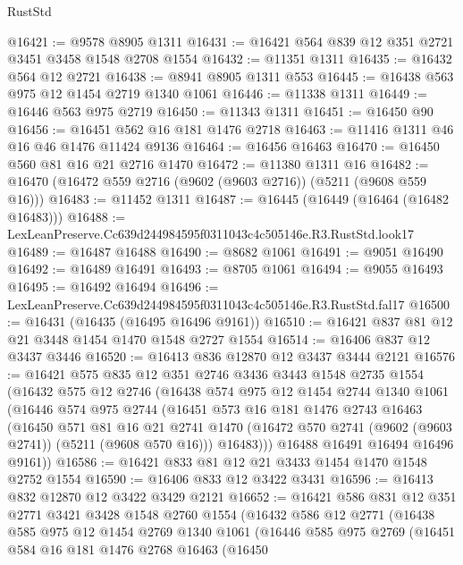 \begin{lexlean}{RustStd}
\begin{coremodule}
@16421 := @9578 @8905 @1311
@16431 := @16421 @564 @839 @12 @351 @2721 @3451 @3458 @1548 @2708 @1554
@16432 := @11351 @1311
@16435 := @16432 @564 @12 @2721
@16438 := @8941 @8905 @1311 @553
@16445 := @16438 @563 @975 @12 @1454 @2719 @1340 @1061
@16446 := @11338 @1311
@16449 := @16446 @563 @975 @2719
@16450 := @11343 @1311
@16451 := @16450 @90
@16456 := @16451 @562 @16 @181 @1476 @2718
@16463 := @11416 @1311 @46 @16 @46 @1476 @11424 @9136
@16464 := @16456 @16463
@16470 := @16450 @560 @81 @16 @21 @2716 @1470
@16472 := @11380 @1311 @16
@16482 := @16470 (@16472 @559 @2716 (@9602 (@9603 @2716)) (@5211 (@9608 @559 @16)))
@16483 := @11452 @1311
@16487 := @16445 (@16449 (@16464 (@16482 @16483)))
@16488 := LexLeanPreserve.Cc639d244984595f0311043c4c505146e.R3.RustStd.look17
@16489 := @16487 @16488
@16490 := @8682 @1061
@16491 := @9051 @16490
@16492 := @16489 @16491
@16493 := @8705 @1061
@16494 := @9055 @16493
@16495 := @16492 @16494
@16496 := LexLeanPreserve.Cc639d244984595f0311043c4c505146e.R3.RustStd.fal17
@16500 := @16431 (@16435 (@16495 @16496 @9161))
@16510 := @16421 @837 @81 @12 @21 @3448 @1454 @1470 @1548 @2727 @1554
@16514 := @16406 @837 @12 @3437 @3446
@16520 := @16413 @836 @12870 @12 @3437 @3444 @2121
@16576 := @16421
    @575
    @835
    @12
    @351
    @2746
    @3436
    @3443
    @1548
    @2735
    @1554
    (@16432
      @575
      @12
      @2746
      (@16438
        @574
        @975
        @12
        @1454
        @2744
        @1340
        @1061
        (@16446
          @574
          @975
          @2744
          (@16451
            @573
            @16
            @181
            @1476
            @2743
            @16463
            (@16450
              @571
              @81
              @16
              @21
              @2741
              @1470
              (@16472 @570 @2741 (@9602 (@9603 @2741)) (@5211 (@9608 @570 @16)))
              @16483)))
        @16488
        @16491
        @16494
        @16496
        @9161))
@16586 := @16421 @833 @81 @12 @21 @3433 @1454 @1470 @1548 @2752 @1554
@16590 := @16406 @833 @12 @3422 @3431
@16596 := @16413 @832 @12870 @12 @3422 @3429 @2121
@16652 := @16421
    @586
    @831
    @12
    @351
    @2771
    @3421
    @3428
    @1548
    @2760
    @1554
    (@16432
      @586
      @12
      @2771
      (@16438
        @585
        @975
        @12
        @1454
        @2769
        @1340
        @1061
        (@16446
          @585
          @975
          @2769
          (@16451
            @584
            @16
            @181
            @1476
            @2768
            @16463
            (@16450

\end{coremodule}
\end{lexlean}
